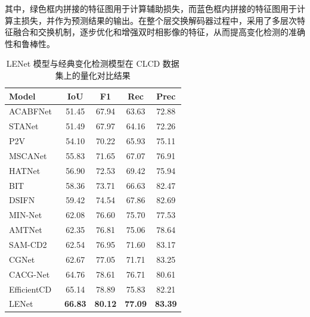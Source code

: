 其中，绿色框内拼接的特征图用于计算辅助损失，而蓝色框内拼接的特征图用于计算主损失，并作为预测结果的输出。在整个层交换解码器过程中，采用了多层次特征融合和交换机制，逐步优化和增强双时相影像的特征，从而提高变化检测的准确性和鲁棒性。

\begin{table}[!htb]
  \centering
  \caption{LENet 模型与经典变化检测模型在 CLCD 数据集上的量化对比结果}
  \label{tab:lenet_clcd}
  \begin{tabular}{lcccc}
    \toprule
    Model                &  IoU   &   F1   &  Rec   &  Prec  \\
    \midrule
    ACABFNet~\cite{Song2023AxialCA}    & 51.45  & 67.94  & 63.63  & 72.88  \\
    STANet~\cite{chen_spatial-temporal_2020}      & 51.49  & 67.97  & 64.16  & 72.26  \\
    P2V~\cite{lin_transition_2023}        & 54.10  & 70.22  & 65.93  & 75.11  \\
    MSCANet~\cite{m_liu_cnn-transformer_2022}     & 55.83  & 71.65  & 67.07  & 76.91  \\
    HATNet~\cite{Xu2024HybridAT}    & 56.90  & 72.53  & 69.42  & 75.94  \\
    BIT~\cite{chen_remote_2022}         & 58.36  & 73.71  & 66.63  & 82.47  \\
    DSIFN~\cite{Zhang2020ADS}       & 59.42  & 74.54  & 67.86  & 82.69  \\
    MIN-Net~\cite{Zhou2024MultistageIN}     & 62.08  & 76.60  & 75.70  & 77.53  \\
    AMTNet~\cite{Liu2023AnAM}      & 62.35  & 76.81  & 75.06  & 78.64  \\
    SAM-CD2~\cite{Sun2024SegmentAM}     & 62.54  & 76.95  & 71.60  & 83.17  \\
    CGNet~\cite{han_change_2023}       & 62.67  & 77.05  & 71.71  & 83.25  \\
    CACG-Net~\cite{Liu2024CandidateAwareAC}    & 64.76  & 78.61  & 76.71  & 80.61  \\
    EfficientCD~\cite{dong_efficientcd_2024}& 65.14  & 78.89  & 75.83  & 82.21  \\
    LENet                & \textbf{66.83} & \textbf{80.12} & \textbf{77.09} & \textbf{83.39} \\
    \bottomrule
  \end{tabular}
\end{table}

